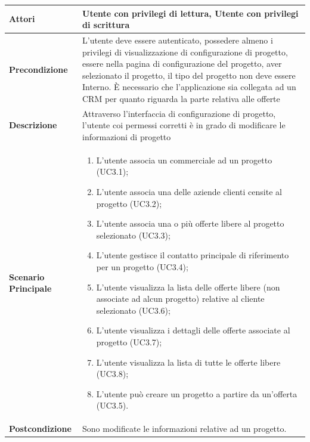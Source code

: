 	\begin{longtable}{ | p{2.7cm} | p{12cm} |}
		\hline \textbf{Attori} & Utente con privilegi di lettura, Utente con privilegi di scrittura\\
		\hline \textbf{Precondizione} &  L’utente deve essere autenticato, possedere almeno i privilegi di visualizzazione di configurazione di progetto, essere nella pagina di configurazione del progetto, aver selezionato il progetto, il tipo del progetto non deve essere Interno. È necessario che l’applicazione sia collegata ad un CRM per quanto riguarda la parte relativa alle offerte\\  
		\hline \textbf{Descrizione} & Attraverso l’interfaccia di configurazione di progetto, l’utente coi permessi corretti è in grado di modificare le informazioni di progetto \\ 
		\hline \textbf{Scenario Principale} & \begin{enumerate}
			\itemsep-0.5em 
			\item L’utente associa un commerciale ad un progetto  (UC3.1);
			\item L’utente associa una delle aziende clienti censite al progetto  (UC3.2);
			\item L’utente associa una o più offerte libere al progetto selezionato  (UC3.3);
			\item L’utente gestisce il contatto principale di riferimento per un progetto  (UC3.4);
			\item L’utente visualizza la lista delle offerte libere (non associate ad alcun progetto) relative al cliente selezionato  (UC3.6);
			\item L’utente visualizza i dettagli delle offerte associate al progetto  (UC3.7);
			\item L’utente visualizza la lista di tutte le offerte libere  (UC3.8);
			\item L’utente può creare un progetto a partire da un’offerta  (UC3.5).
			
		\end{enumerate}
		\\ 
		\hline \textbf{Postcondizione} & Sono modificate le informazioni relative ad un progetto. \\ 
		\hline 
	\end{longtable}
	
	\hypertarget{UC3.4}{}
